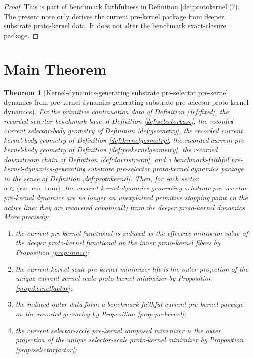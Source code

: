 \documentclass[11pt]{article}
\newcommand{\Car}{\mathrm{car}}
\newcommand{\Cur}{\mathrm{cur}}
\newcommand{\Hom}{\mathrm{hom}}
\newtheorem{theorem}{Theorem}
\begin{document}
\begin{proof}
This is part of benchmark faithfulness in Definition \ref{def:protokernel}(7). The present note only derives the current pre-kernel package from deeper substrate proto-kernel data. It does not alter the benchmark exact-closure package.
\end{proof}

\section{Main Theorem}

\begin{theorem}[Kernel-dynamics-generating substrate pre-selector pre-kernel dynamics from pre-kernel-dynamics-generating substrate pre-selector proto-kernel dynamics]
\label{thm:main}
Fix the primitive continuation data of Definition \ref{def:fixed}, the recorded selector benchmark base of Definition \ref{def:selectorbase}, the recorded current selector-body geometry of Definition \ref{def:geometry}, the recorded current kernel-body geometry of Definition \ref{def:kernelgeometry}, the recorded current pre-kernel-body geometry of Definition \ref{def:prekernelgeometry}, the recorded downstream chain of Definition \ref{def:downstream}, and a benchmark-faithful pre-kernel-dynamics-generating substrate pre-selector proto-kernel dynamics package in the sense of Definition \ref{def:protokernel}. Then, for each sector \(\sigma\in\{\Car,\Cur,\Hom\}\), the current kernel-dynamics-generating substrate pre-selector pre-kernel dynamics are no longer an unexplained primitive stopping point on the active line: they are recovered canonically from the deeper proto-kernel dynamics. More precisely:
\begin{enumerate}
    \item the current pre-kernel functional is induced as the effective minimum value of the deeper proto-kernel functional on the inner proto-kernel fibers by Proposition \ref{prop:inner};
    \item the current-kernel-scale pre-kernel minimizer lift is the outer projection of the unique current-kernel-scale proto-kernel minimizer by Proposition \ref{prop:kernelfactor};
    \item the induced outer data form a benchmark-faithful current pre-kernel package on the recorded geometry by Proposition \ref{prop:prekernel};
    \item the current selector-scale pre-kernel composed minimizer is the outer projection of the unique selector-scale proto-kernel minimizer by Proposition \ref{prop:selectorfactor};

\end{enumerate}
\end{theorem}
\end{document}
